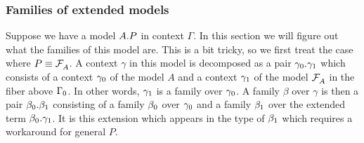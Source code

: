 \subsubsection{Families of extended models}
Suppose we have a model $\ctxext{A}{P}$ in context $\Gamma$. In this section we
will figure out what the families of this model are. This is a bit tricky, so
we first treat the case where $P\jdeq\mfam{A}$. A context $\gamma$ in this
model is decomposed as a pair $\tmext{A}{\mfam{A}}{\pts{\gamma}}{\edg{\gamma}}$
which consists of a context $\pts{\gamma}$ of the model $A$ and a context
$\edg{\gamma}$ of the model $\mfam{A}$ in the fiber above $\pts{\Gamma}$. In
other words, $\edg{\gamma}$ is a family over $\pts{\gamma}$. A family $\beta$
over $\gamma$ is then a pair $\tmext{}{}{\pts{\beta}}{\edg{\beta}}$ consisting
of a family $\pts{\beta}$ over $\pts{\gamma}$ and a family $\edg{\beta}$ over
the extended term $\tmext{}{}{\pts{\beta}}{\edg{\gamma}}$. 
It is this extension which appears in the type of $\edg{\beta}$ which requires
a workaround for general $P$.

